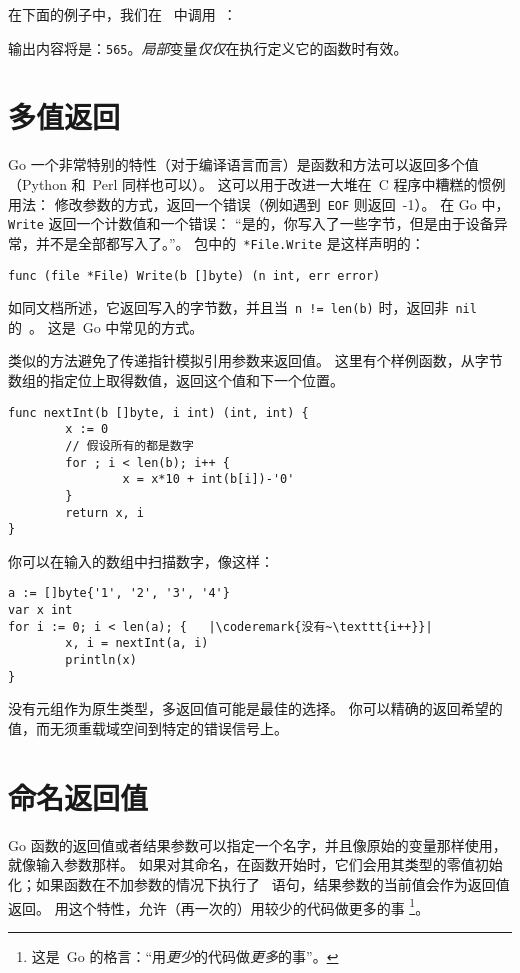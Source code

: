 在下面的例子中，我们在~ 中调用~：



输出内容将是：\texttt{565}。\emph{局部}变量\emph{仅仅}在执行定义它的函数时有效。

\section{多值返回}
\label{sec:multiple return}
Go 一个非常特别的特性（对于编译语言而言）是函数和方法可以返回多个值（Python 和~Perl 同样也可以）。
这可以用于改进一大堆在~C 程序中糟糕的惯例用法：
修改参数的方式，返回一个错误（例如遇到~\texttt{EOF} 则返回~-1）。
在 Go 中，\lstinline{Write} 返回一个计数值和一个错误：
``是的，你写入了一些字节，但是由于设备异常，并不是全部都写入了。''。
 包中的~\lstinline{*File.Write} 是这样声明的：
\begin{lstlisting}
func (file *File) Write(b []byte) (n int, err error)
\end{lstlisting}
如同文档所述，它返回写入的字节数，并且当~\lstinline{n != len(b)} 时，返回非~\lstinline{nil} 的~。
这是~Go 中常见的方式。

类似的方法避免了传递指针模拟引用参数来返回值。
这里有个样例函数，从字节数组的指定位上取得数值，返回这个值和下一个位置。
\begin{lstlisting}
func nextInt(b []byte, i int) (int, int) {
        x := 0
        // 假设所有的都是数字
        for ; i < len(b); i++ {
                x = x*10 + int(b[i])-'0'
        }
        return x, i
}
\end{lstlisting}
你可以在输入的数组中扫描数字，像这样：
\begin{lstlisting}
a := []byte{'1', '2', '3', '4'}
var x int
for i := 0; i < len(a); {	|\coderemark{没有~\texttt{i++}}|
        x, i = nextInt(a, i)
        println(x)
}
\end{lstlisting}
没有元组作为原生类型，多返回值可能是最佳的选择。
你可以精确的返回希望的值，而无须重载域空间到特定的错误信号上。

\section{命名返回值}
\label{sec:named result parameters}
Go 函数的返回值或者结果参数可以指定一个名字，并且像原始的变量那样使用，就像输入参数那样。
如果对其命名，在函数开始时，它们会用其类型的零值初始化；如果函数在不加参数的情况下执行了~
 语句，结果参数的当前值会作为返回值返回。
用这个特性，允许（再一次的）用较少的代码做更多的事
\footnote{这是~Go 的格言：``用\emph{更少}的代码做\emph{更多}的事''。}。

